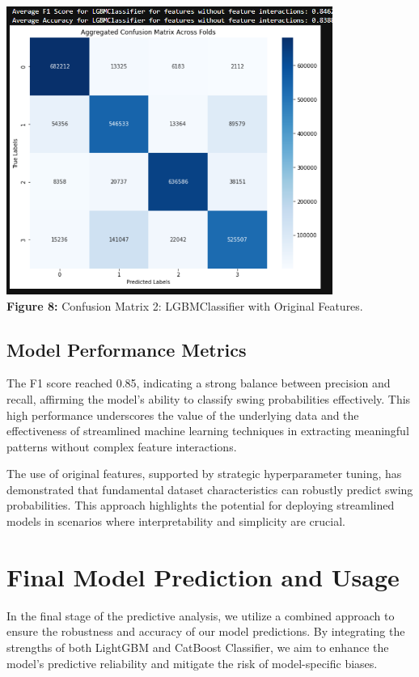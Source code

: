 \documentclass[12pt]{article}
\begin{document}
\begin{center}
    \includegraphics[width=0.8\textwidth]{LgbmOriginalFeatures.png}
    \textbf{\\Figure 8:} Confusion Matrix 2: LGBMClassifier with Original Features.
\end{center}

\subsection*{Model Performance Metrics}
The F1 score reached 0.85, indicating a strong balance between precision and recall, affirming the model’s ability to classify swing probabilities effectively. This high performance underscores the value of the underlying data and the effectiveness of streamlined machine learning techniques in extracting meaningful patterns without complex feature interactions.

\textbf{}
The use of original features, supported by strategic hyperparameter tuning, has demonstrated that fundamental dataset characteristics can robustly predict swing probabilities. This approach highlights the potential for deploying streamlined models in scenarios where interpretability and simplicity are crucial.

\maketitle

\section{Final Model Prediction and Usage}
In the final stage of the predictive analysis, we utilize a combined approach to ensure the robustness and accuracy of our model predictions. By integrating the strengths of both LightGBM and CatBoost Classifier, we aim to enhance the model's predictive reliability and mitigate the risk of model-specific biases.
\end{document}

